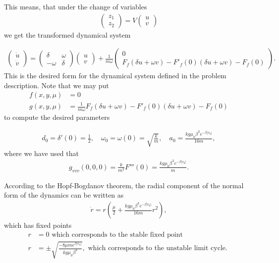 \begin{solution}[4.4]
\begin{enumerate}
This means, that under  the change of variables 
\begin{align}
\begin{pmatrix} z_1 \\ z_2 \end{pmatrix} = V \begin{pmatrix} u \\ v\end{pmatrix}
\end{align}
 we get the transformed dynamical system
 
 \begin{align}
 \begin{pmatrix} \dot{u} \\ \dot{v} \end{pmatrix} = \begin{pmatrix} \delta  & \omega  \\  -\omega & \delta \end{pmatrix}\begin{pmatrix} u \\ v  \end{pmatrix} + \frac{1}{m\omega}\begin{pmatrix} 0  \\ F_f(\delta u + \omega v) - F'_f(0)(\delta u + \omega v) - F_f (0)\end{pmatrix}.
 \end{align}
 This is the desired form for the dynamical system defined in the problem description. Note that we may put
 \begin{align}
 f(x,y,\mu) &=0 \\
 g(x,y,\mu) &= \frac{1}{m\omega} F_f(\delta u + \omega v) - F'_f(0)(\delta u + \omega v) - F_f (0)
 \end{align}
 to compute the desired parameters
 
 \begin{align}
d_0 = \delta'(0)=\frac{1}{2}, \quad \omega_0 = \omega(0)= \sqrt{\frac{k}{m}}, \quad a_0 = \frac{kg\mu_0 \beta^3 e^{-\beta |v_0|}}{16m},
 \end{align}
where we have used that 
\begin{align}
g_{vvv}(0,0,0) = \frac{k}{m^2}F'''(0)= \frac{kg\mu_0 \beta^3 e^{-\beta |v_0|}}{m}.
\end{align}

According to the Hopf-Bogdanov theorem, the radial component of the normal form of the dynamics can be written as
\begin{align}
\boxed{\dot{r}=r\left( \frac{\mu}{2}+ \frac{kg\mu_0 \beta^3 e^{-\beta |v_0|}}{16m}r^2\right)},
\end{align}
which has fixed points 
\begin{align}
	r&=0 \text{ which corresponds to the stable fixed point} \\
	r &= \pm \sqrt{\frac{-8\mu m e^{\beta |v_0|}}{kg\mu_0 \beta^3}}, \text{ which corresponds to the unstable limit cycle. }
\end{align}


\end{enumerate}
\end{solution}
